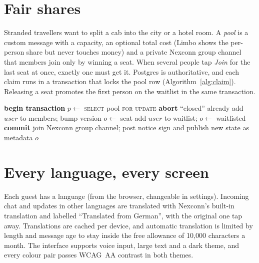 \documentclass[10pt,twocolumn]{article}
\begin{document}
\section{Fair shares}\label{sec:pools}
Stranded travellers want to split a cab into the city or a hotel room. A \emph{pool} is a custom message with a
capacity, an optional total cost (Limbo shows the per-person share but never touches money) and a private Nexconn group
channel that members join only by winning a seat. When several people tap \emph{Join} for the last seat at once,
exactly one must get it. Postgres is authoritative, and each claim runs in a transaction that locks the pool row
(Algorithm~\ref{alg:claim}). Releasing a seat promotes the first person on the waitlist in the same transaction.

\begin{algorithm}[t]
\caption{Claiming a seat}\label{alg:claim}
\small
\begin{algorithmic}[1]
  \State \textbf{begin transaction}
  \State $p \gets$ \textsc{select} pool \textsc{for update} 
   \State \textbf{abort} ``closed'' \EndIf
   \State \Return already \EndIf
    \State add $user$ to members; bump version
    \State $o \gets$ seat
  \Else
    \State add $user$ to waitlist; $o \gets$ waitlisted
  \EndIf
  \State \textbf{commit}
   \State join Nexconn group channel; post notice \EndIf
  \State sign and publish new state as metadata
  \State \Return $o$
\EndFunction
\end{algorithmic}
\end{algorithm}

\section{Every language, every screen}\label{sec:lang}
Each guest has a language (from the browser, changeable in settings). Incoming chat and updates in other languages are
translated with Nexconn's built-in translation and labelled ``Translated from German'', with the original one tap away.
Translations are cached per device, and automatic translation is limited by length and message age to stay inside
the free allowance of 10{,}000 characters a month. The interface supports voice input, large text and a dark theme,
and every colour pair passes WCAG~AA contrast in both themes.
\end{document}
